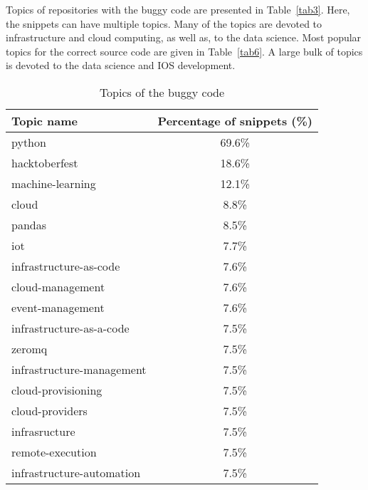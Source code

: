 \documentclass[10pt,conference]{IEEEtran}
\begin{document}

Topics of repositories with the buggy code are presented in Table~\ref{tab3}. Here, the snippets can have multiple topics.
Many of the topics are devoted to infrastructure and cloud computing, as well as, to the data science.
Most popular topics for the correct source code are given in Table~\ref{tab6}. A large bulk of topics is devoted to the data science and IOS development.

\begin{table}[htbp]
\caption{Topics of the buggy code}
\begin{center}
\renewcommand{\arraystretch}{1.2}
\begin{tabular}{| l | c |}
\hline
  \textbf{Topic name}  & \textbf{Percentage of snippets (\%)} \\
\hline
  python & 69.6\color{lightgray}\% \\
\hline
  hacktoberfest & 18.6\color{lightgray}\% \\
\hline
  machine-learning  & 12.1\color{lightgray}\% \\
\hline
  cloud & 8.8\color{lightgray}\% \\
\hline
  pandas & 8.5\color{lightgray}\% \\
\hline
  iot  &  7.7\color{lightgray}\% \\
\hline
  infrastructure-as-code &  7.6\color{lightgray}\% \\
\hline
  cloud-management &  7.6\color{lightgray}\%  \\
\hline
  event-management &  7.6\color{lightgray}\%  \\
\hline
  infrastructure-as-a-code &  7.5\color{lightgray}\% \\
\hline
  zeromq &   7.5\color{lightgray}\% \\
\hline
  infrastructure-management  &   7.5\color{lightgray}\% \\
\hline
  cloud-provisioning &   7.5\color{lightgray}\% \\
\hline
  cloud-providers &   7.5\color{lightgray}\% \\
\hline
  infrasructure &   7.5\color{lightgray}\% \\
\hline
  remote-execution  &   7.5\color{lightgray}\% \\
\hline
   infrastructure-automation &   7.5\color{lightgray}\% \\

\end{tabular}
\end{center}
\end{table}
\end{document}
